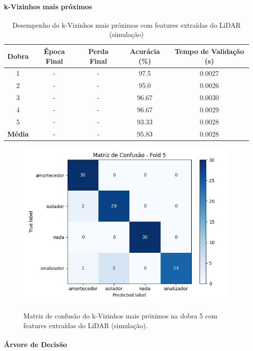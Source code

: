 \paragraph{k-Vizinhos mais próximos}

\begin{table}[H]
\centering
\caption{Desempenho do k-Vizinhos mais próximos com features extraídas do LiDAR (simulação)}
\label{tab:knn_features_lidar_simulado}
\begin{tabular}{ccccc}
\hline
\textbf{Dobra} & \textbf{Época Final} & \textbf{Perda Final} & \textbf{Acurácia (\%)} & \textbf{Tempo de Validação (s)} \\
\hline
1 & - & - & 97.5  & 0.0027 \\
2 & - & - & 95.0  & 0.0026 \\
3 & - & - & 96.67 & 0.0030 \\
4 & - & - & 96.67 & 0.0029 \\
5 & - & - & 93.33 & 0.0028 \\
\hline
\textbf{Média} & - & - & 95.83 & 0.0028 \\
\hline
\end{tabular} \fonte{}
\end{table}

\begin{figure}[H]
\caption{Matriz de confusão do k-Vizinhos mais próximos na dobra 5 com features extraídas do LiDAR (simulação).}
\includegraphics[width=0.7\linewidth]{figuras/Resultados/simu_principal_Teste4_knn.png}
\fonte{}
\label{fig:matriz_confusao_knn_lidar_features}
\end{figure}


\paragraph{Árvore de Decisão}

